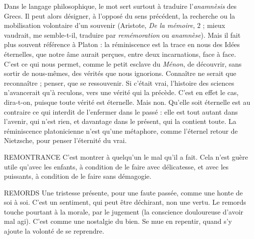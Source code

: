 Dans le langage philosophique, le mot sert surtout à traduire l’{\it anamnèsis}
des Grecs. Il peut alors désigner, à l'opposé du sens précédent, la recherche ou
la mobilisation volontaire d’un souvenir (Aristote, {\it De la mémoire}, 2 ; mieux
vaudrait, me semble-t-il, traduire par {\it remémoration} ou {\it anamnèse}). Mais il fait
plus souvent référence à Platon : la réminiscence est la trace en nous des Idées
éternelles, que notre âme aurait perçues, entre deux incarnations, face à face.
C’est ce qui nous permet, comme le petit esclave du {\it Ménon}, de découvrir, sans
sortir de nous-mêmes, des vérités que nous ignorions. Connaître ne serait que
reconnaître ; penser, que se ressouvenir. Si c'était vrai, l’histoire des sciences
n’avancerait qu’à reculons, vers une vérité qui la précède. C’est en effet le cas,
dira-t-on, puisque toute vérité est éternelle. Mais non. Qu'elle soit éternelle
est au contraire ce qui interdit de l’enfermer dans le passé : elle est tout autant
dans l'avenir, qui n’est rien, et davantage dans le présent, qui la contient toute.
La réminiscence platonicienne n’est qu’une métaphore, comme l’éternel retour
de Nietzsche, pour penser l'éternité du vrai.

REMONTRANCE C’est montrer à quelqu’un le mal qu’il a fait. Cela n’est
guère utile qu'avec les enfants, à condition de le faire
avec délicatesse, et avec les puissants, à condition de le faire sans démagogie.

REMORDS Une tristesse présente, pour une faute passée, comme une honte
de soi à soi. C’est un sentiment, qui peut être déchirant, non
une vertu. Le remords touche pourtant à la morale, par le jugement (la conscience
douloureuse d’avoir mal agi). C’est comme une nostalgie du bien. Se
mue en repentir, quand s’y ajoute la volonté de se reprendre.

